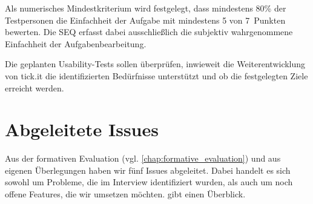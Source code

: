 Als numerisches Mindestkriterium wird festgelegt, dass mindestens 80\% der Testpersonen die Einfachheit der Aufgabe mit mindestens 5 von 7~Punkten bewerten.
Die SEQ erfasst dabei ausschließlich die subjektiv wahrgenommene Einfachheit der Aufgabenbearbeitung.

Die geplanten Usability-Tests sollen überprüfen, inwieweit die Weiterentwicklung von tick.it die identifizierten Bedürfnisse unterstützt und ob die festgelegten Ziele erreicht werden.

\section{Abgeleitete Issues}
\label{sec:pt-issues}

Aus der formativen Evaluation (vgl. \cref{chap:formative_evaluation}) und aus eigenen Überlegungen haben wir fünf Issues abgeleitet.
Dabei handelt es sich sowohl um Probleme, die im Interview identifiziert wurden, als auch um noch offene Features, die wir umsetzen möchten.
 gibt einen Überblick.


